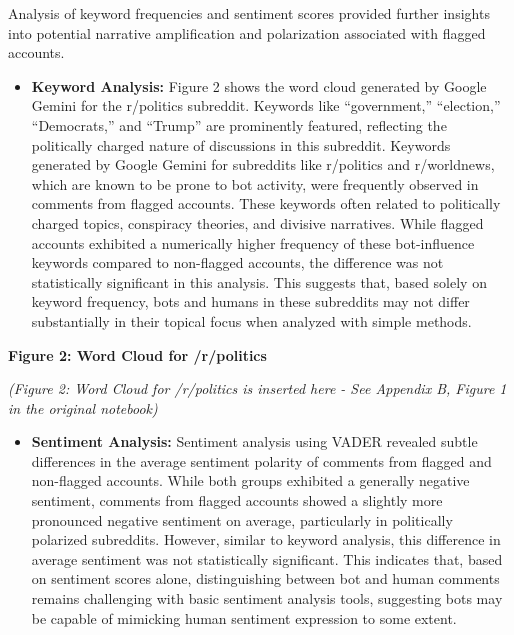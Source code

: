\documentclass[
  12pt,
  letterpaper,
  DIV=11,
  numbers=noendperiod]{scrartcl}
\providecommand{\tightlist}{%
  \setlength{\itemsep}{0pt}\setlength{\parskip}{0pt}}\usepackage{longtable,booktabs,array}
\begin{document}
Analysis of keyword frequencies and sentiment scores provided further
insights into potential narrative amplification and polarization
associated with flagged accounts.

\begin{itemize}
\tightlist
\item
  \textbf{Keyword Analysis:} Figure 2 shows the word cloud generated by
  Google Gemini for the r/politics subreddit. Keywords like
  ``government,'' ``election,'' ``Democrats,'' and ``Trump'' are
  prominently featured, reflecting the politically charged nature of
  discussions in this subreddit. Keywords generated by Google Gemini for
  subreddits like r/politics and r/worldnews, which are known to be
  prone to bot activity, were frequently observed in comments from
  flagged accounts. These keywords often related to politically charged
  topics, conspiracy theories, and divisive narratives. While flagged
  accounts exhibited a numerically higher frequency of these
  bot-influence keywords compared to non-flagged accounts, the
  difference was not statistically significant in this analysis. This
  suggests that, based solely on keyword frequency, bots and humans in
  these subreddits may not differ substantially in their topical focus
  when analyzed with simple methods.
\end{itemize}

\textbf{Figure 2: Word Cloud for /r/politics}

\emph{(Figure 2: Word Cloud for /r/politics is inserted here - See
Appendix B, Figure 1 in the original notebook)}

\begin{itemize}
\tightlist
\item
  \textbf{Sentiment Analysis:} Sentiment analysis using VADER revealed
  subtle differences in the average sentiment polarity of comments from
  flagged and non-flagged accounts. While both groups exhibited a
  generally negative sentiment, comments from flagged accounts showed a
  slightly more pronounced negative sentiment on average, particularly
  in politically polarized subreddits. However, similar to keyword
  analysis, this difference in average sentiment was not statistically
  significant. This indicates that, based on sentiment scores alone,
  distinguishing between bot and human comments remains challenging with
  basic sentiment analysis tools, suggesting bots may be capable of
  mimicking human sentiment expression to some extent.
\end{itemize}
\end{document}
